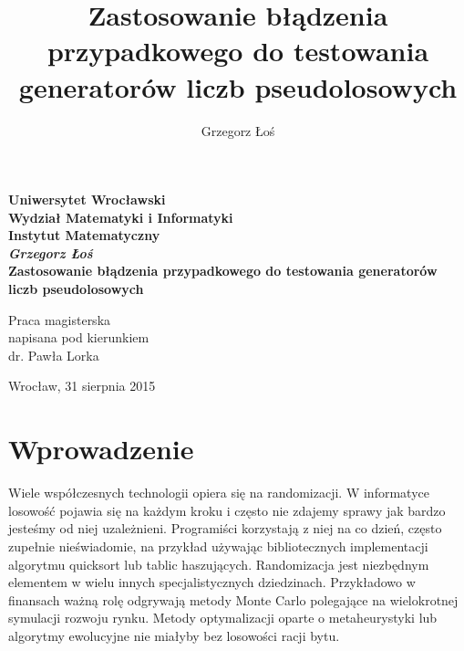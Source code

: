 \documentclass[a4paper,11pt,twoside]{book}
\title{Zastosowanie błądzenia przypadkowego do testowania generatorów liczb pseudolosowych}
\author{Grzegorz Łoś}
\theoremstyle{definition}
\begin{document}
\thispagestyle{empty}
\begin{center}
\textbf{\large Uniwersytet Wrocławski\\
Wydział Matematyki i Informatyki\\
Instytut Matematyczny}\\
\vspace{4cm}
\textbf{\textit{\large Grzegorz Łoś}\\
\vspace{0.5cm}
{\Large Zastosowanie błądzenia przypadkowego do testowania generatorów liczb pseudolosowych}}\\
\end{center}
\vspace{3cm}
{\large \hspace*{6.5cm}Praca magisterska\\
\hspace*{6.5cm}napisana pod kierunkiem\\
\hspace*{6.5cm}dr. Pawła Lorka }\\
\vfill
\begin{center}
{\large Wrocław, 31 sierpnia 2015}\\
\end{center}

\newpage
\thispagestyle{empty}
\begin{minipage}{0.5\linewidth}
\end{minipage}

\newpage


\begin{minipage}{0.8\linewidth}
\tableofcontents
\end{minipage}

\chapter*{Wprowadzenie}
Wiele współczesnych technologii opiera się na randomizacji. W informatyce losowość pojawia się na każdym kroku i często nie zdajemy sprawy jak bardzo jesteśmy od niej uzależnieni. Programiści korzystają z niej na co dzień, często zupełnie nieświadomie, na przykład używając bibliotecznych implementacji algorytmu quicksort lub tablic haszujących. Randomizacja jest niezbędnym elementem w wielu innych specjalistycznych dziedzinach. Przykładowo w finansach ważną rolę odgrywają metody Monte Carlo polegające na wielokrotnej symulacji rozwoju rynku. Metody optymalizacji oparte o metaheurystyki lub algorytmy ewolucyjne nie miałyby bez losowości racji bytu.
\end{document}
